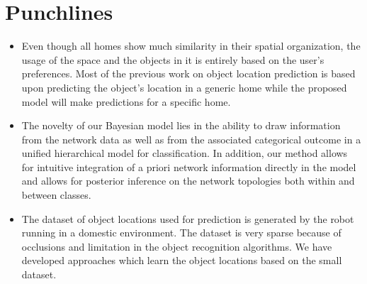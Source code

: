 \documentclass{llncs}
\begin{document}
\section{Punchlines}
\begin{itemize}
	\item Even though all homes show much similarity in their spatial organization, the usage of the space and the objects in it is entirely based on the user’s preferences. Most of the previous work on object location prediction is based upon predicting the object’s location in a generic home while the proposed model will make predictions for a specific home.
	\item The novelty of our Bayesian model lies in the ability to draw information from the network data as well as from the associated categorical outcome in a unified hierarchical model for classification. In addition, our method allows for intuitive integration of a priori network information directly in the model and allows for posterior inference on the network topologies both within and between classes.
	\item The dataset of object locations used for prediction is generated by the robot running in a domestic environment. The dataset is very sparse because of occlusions and limitation in the object recognition algorithms. We have developed approaches which learn the object locations based on the small dataset.
\end{itemize}
\end{document}
